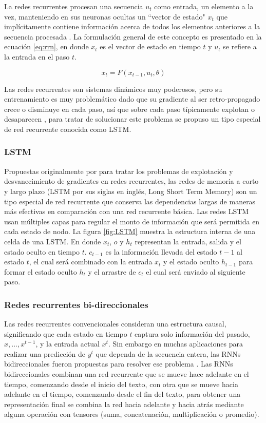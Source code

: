 La redes recurrentes procesan una secuencia $u_t$ como entrada, un elemento a la vez, manteniendo en sus neuronas ocultas un  ``vector de estado" $x_t$ que implícitamente contiene información acerca de todos los elementos anteriores a la secuencia procesada \cite{lecun2015deep}. La formulación general de este concepto es presentado en la ecuación \ref{eq:rrn}, en donde $x_t$ es el vector de estado en tiempo $t$ y $u_t$ se refiere a la entrada en el paso $t$.


\begin{equation} \label{eq:rrn}
    x_t = F(x_{t-1}, u_t, \theta )
\end{equation}


Las redes recurrentes son sistemas dinámicos muy poderosos, pero su entrenamiento es muy problemático dado que su gradiente al ser retro-propagado crece o disminuye en cada paso, así que sobre cada paso típicamente explotan o desaparecen \citep{lecun2015deep}, para tratar de solucionar este problema se propuso un tipo especial de red recurrente conocida como LSTM.

\subsubsection{LSTM}
Propuestas originalmente por \citep{hochreiter1997long} para tratar los problemas de explotación y desvanecimiento de gradientes en redes recurrentes, las redes de memoria a corto y largo plazo (LSTM por sus siglas en inglés, Long Short Term Memory) son un tipo especial de red recurrente que conserva las dependencias largas de maneras más efectivas en comparación con una red recurrente básica. Las redes LSTM usan múltiples capas para regular el monto de información que será permitida en cada estado de nodo. La figura \ref{fig:LSTM} muestra la estructura interna de una celda de una LSTM. En donde $x_t$, $o$ y $h_t$ representan la entrada, salida y el estado oculto en tiempo $t$. $c_{t-1}$ es la información llevada del estado $t-1$ al estado $t$, el cual será combinado con la entrada $x_t$ y el estado oculto $h_{t-1}$ para formar el estado oculto $h_t$ y el arrastre de $c_t$ el cual será enviado al siguiente paso.

\subsubsection{Redes recurrentes bi-direccionales}
Las redes recurrentes convencionales consideran una estructura causal, significando que cada estado en tiempo $t$ captura solo información del pasado, $x,..., x^{t-1}$, y la entrada actual $x^t$. Sin embargo en muchas aplicaciones para realizar una predicción de $y^t$ que dependa de la secuencia entera, las RNNs bidireccionales fueron propuestas para resolver ese problema  \citep{schuster1997bidirectional}. Las RNNs bidireccionales combinan una red recurrente que se mueve hace adelante en el tiempo, comenzando desde el inicio del texto, con otra que se mueve hacia adelante en el tiempo, comenzando desde el fin del texto, para obtener una representación final se combina la red hacia adelante y hacia atrás mediante alguna operación con tensores (suma, concatenación, multiplicación o promedio). 



